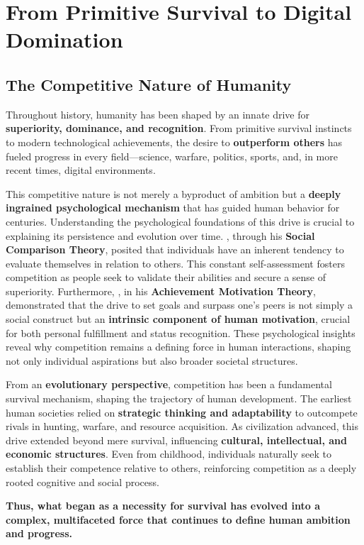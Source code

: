 \chapter{From Primitive Survival to Digital Domination}
\section{The Competitive Nature of Humanity}
Throughout history, humanity has been shaped by an innate drive for \textbf{superiority, dominance, and recognition}. From primitive survival instincts to modern technological achievements, the desire to \textbf{outperform others} has fueled progress in every field—science, warfare, politics, sports, and, in more recent times, digital environments.

This competitive nature is not merely a byproduct of ambition but a \textbf{deeply ingrained psychological mechanism} that has guided human behavior for centuries. Understanding the psychological foundations of this drive is crucial to explaining its persistence and evolution over time. \textcite{festinger1954theory}, through his \textbf{Social Comparison Theory}, posited that individuals have an inherent tendency to evaluate themselves in relation to others. This constant self-assessment fosters competition as people seek to validate their abilities and secure a sense of superiority. Furthermore, \textcite{mcclelland1961achievement}, in his \textbf{Achievement Motivation Theory}, demonstrated that the drive to set goals and surpass one's peers is not simply a social construct but an \textbf{intrinsic component of human motivation}, crucial for both personal fulfillment and status recognition. These psychological insights reveal why competition remains a defining force in human interactions, shaping not only individual aspirations but also broader societal structures.

From an \textbf{evolutionary perspective}, competition has been a fundamental survival mechanism, shaping the trajectory of human development. The earliest human societies relied on \textbf{strategic thinking and adaptability} to outcompete rivals in hunting, warfare, and resource acquisition. As civilization advanced, this drive extended beyond mere survival, influencing \textbf{cultural, intellectual, and economic structures}. Even from childhood, individuals naturally seek to establish their competence relative to others, reinforcing competition as a deeply rooted cognitive and social process.  

\begin{center}
\textbf{Thus, what began as a necessity for survival has evolved into a complex, multifaceted force that continues to define human ambition and progress.}
\end{center}

